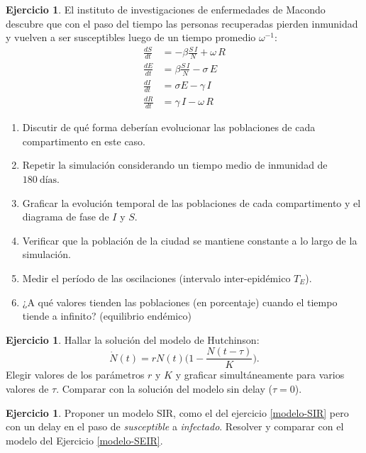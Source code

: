 \documentclass[12pt, a4paper]{amsbook}
\theoremstyle{remark}
\theoremstyle{definition}
\newtheorem{ejer}[teo]{Ejercicio}
\numberwithin{section}{chapter}
\numberwithin{subsection}{section}
\numberwithin{equation}{section}
\numberwithin{figure}{chapter}
\begin{document}
\begin{ejer}\label{modelo-SEIRS}
El instituto de investigaciones de enfermedades de Macondo descubre que con el paso del tiempo las personas recuperadas pierden inmunidad y vuelven a ser susceptibles luego de un tiempo promedio $\omega^{-1}$:
\begin{align*}
    \frac{dS}{dt} &= -\beta \frac{S\,I}{N} + \omega\,R\\
    \frac{dE}{dt} &= \beta \frac{S\,I}{N} -\sigma \, E\\
    \frac{dI}{dt} &= \sigma E -\gamma\, I\\
    \frac{dR}{dt} &= \gamma\, I - \omega\,R
\end{align*}
\begin{enumerate}
    \item Discutir de qué forma deberían evolucionar las poblaciones de cada compartimento en este caso. 
    \item Repetir la simulación considerando un tiempo medio de inmunidad de $180~\text{días}$. 
    \item Graficar la evolución temporal de las poblaciones de cada compartimento y el diagrama de fase de $I$ y $S$.
    \item Verificar que la población de la ciudad se mantiene constante a lo largo de la simulación.
    \item Medir el período de las oscilaciones (intervalo inter-epidémico $T_E$).
    \item ¿A qué valores tienden las poblaciones (en porcentaje) cuando el tiempo tiende a infinito? (equilibrio endémico)
\end{enumerate}
\end{ejer}


\begin{ejer} Hallar la solución del modelo de Hutchinson:
\[\dot{N}(t) = rN(t)\Big(1-\frac{N(t-\tau)}{K}\Big).\]
Elegir valores de los parámetros $r$ y $K$ y graficar simultáneamente para varios valores de $\tau$. Comparar con la solución del modelo sin delay ($\tau=0$).
\end{ejer}


\begin{ejer}
Proponer un modelo SIR, como el del ejercicio \ref{modelo-SIR} pero con un delay en el paso de \emph{susceptible} a \emph{infectado}. Resolver y comparar con el modelo del Ejercicio \ref{modelo-SEIR}.
\end{ejer}
\end{document}
